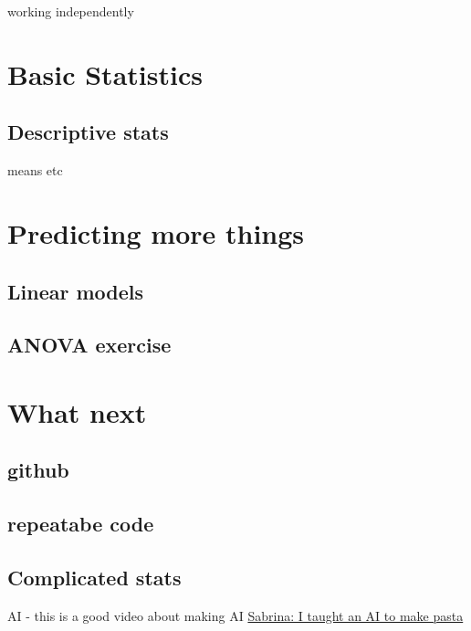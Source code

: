\documentclass[
]{book}
\begin{document}
working independently

\hypertarget{statsbasic}{%
\chapter{Basic Statistics}\label{statsbasic}}

\hypertarget{descstats}{%
\section{Descriptive stats}\label{descstats}}

means
etc

\hypertarget{statsfreq}{%
\chapter{Predicting more things}\label{statsfreq}}

\hypertarget{linear-models}{%
\section{Linear models}\label{linear-models}}

\hypertarget{exercise9_1}{%
\section{ANOVA exercise}\label{exercise9_1}}

\hypertarget{whatnext}{%
\chapter{What next}\label{whatnext}}

\hypertarget{github}{%
\section{github}\label{github}}

\hypertarget{repeatablecode}{%
\section{repeatabe code}\label{repeatablecode}}

\hypertarget{adv_stats}{%
\section{Complicated stats}\label{adv_stats}}

AI - this is a good video about making AI \href{https://youtu.be/Y_NvR5dIaOY?list=LLJ1tgo7aEDCRH3FJF6IJMdA}{Sabrina: I taught an AI to make pasta}
\end{document}
